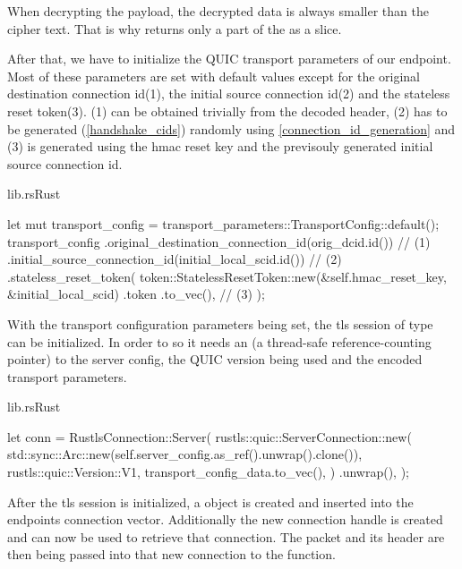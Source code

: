 When decrypting the payload, the decrypted data is always smaller than the cipher text. That is why 
returns only a part of the  as a slice.

After that, we have to initialize the QUIC transport parameters of our endpoint. Most of these parameters are set with default values
except for the original destination connection id(1), the initial source connection id(2) and the stateless reset token(3). (1) can
be obtained trivially from the decoded header, (2) has to be generated (\ref{handshake_cids}) randomly using \ref{connection_id_generation}
and (3) is generated using the hmac reset key and the previsouly generated initial source connection id.

\begin{codeblock}{lib.rs}{Rust}
    \begin{rustcode}
        let mut transport_config = transport_parameters::TransportConfig::default();
        transport_config
            .original_destination_connection_id(orig_dcid.id()) // (1)
            .initial_source_connection_id(initial_local_scid.id()) // (2)
            .stateless_reset_token( 
                token::StatelessResetToken::new(&self.hmac_reset_key, &initial_local_scid)
                    .token
                    .to_vec(), // (3)
            );
    \end{rustcode}
\end{codeblock}

With the transport configuration parameters being set, the tls session of type \\ 
 can be initialized. In order to so it needs an  (a thread-safe reference-counting pointer)
to the server config, the QUIC version being used and the encoded transport parameters.

\begin{codeblock}{lib.rs}{Rust}
    \begin{rustcode}
        let conn = RustlsConnection::Server(
            rustls::quic::ServerConnection::new(
                std::sync::Arc::new(self.server_config.as_ref().unwrap().clone()),
                rustls::quic::Version::V1,
                transport_config_data.to_vec(),
            )
            .unwrap(),
        );
    \end{rustcode}
\end{codeblock}
        
After the tls session is initialized, a  object is created and inserted into the endpoints
connection vector. Additionally the new connection handle is created and can now be used to retrieve that connection. 
The packet and its header are then being passed into that new connection to the  function.

